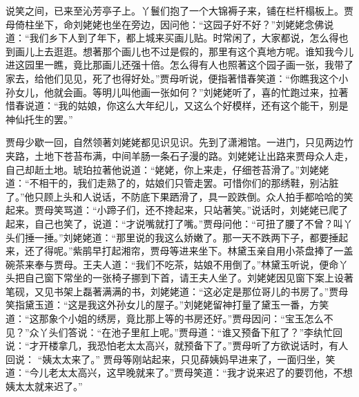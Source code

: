 \begin{parag}
    说笑之间，已来至沁芳亭子上。丫鬟们抱了一个大锦褥子来，铺在栏杆榻板上。贾母倚柱坐下，命刘姥姥也坐在旁边，因问他：“这园子好不好？”刘姥姥念佛说道：“我们乡下人到了年下，都上城来买画儿贴。时常闲了，大家都说，怎么得也到画儿上去逛逛。想著那个画儿也不过是假的，那里有这个真地方呢。谁知我今儿进这园里一瞧，竟比那画儿还强十倍。怎么得有人也照著这个园子画一张，我带了家去，给他们见见，死了也得好处。”贾母听说，便指著惜春笑道：“你瞧我这个小孙女儿，他就会画。等明儿叫他画一张如何？”刘姥姥听了，喜的忙跑过来，拉著惜春说道：“我的姑娘，你这么大年纪儿，又这么个好模样，还有这个能干，别是神仙托生的罢。”
\end{parag}


\begin{parag}
    贾母少歇一回，自然领著刘姥姥都见识见识。先到了潇湘馆。一进门，只见两边竹夹路，土地下苍苔布满，中间羊肠一条石子漫的路。刘姥姥让出路来贾母众人走，自己却赾土地。琥珀拉著他说道：“姥姥，你上来走，仔细苍苔滑了。”刘姥姥道：“不相干的，我们走熟了的，姑娘们只管走罢。可惜你们的那绣鞋，别沾脏了。”他只顾上头和人说话，不防底下果跴滑了，具一跤跌倒。众人拍手都哈哈的笑起来。贾母笑骂道：“小蹄子们，还不搀起来，只站著笑。”说话时，刘姥姥已爬了起来，自己也笑了，说道：“才说嘴就打了嘴。”贾母问他：“可扭了腰了不曾？叫丫头们捶一捶。”刘姥姥道：“那里说的我这么娇嫩了。那一天不跌两下子，都要捶起来，还了得呢。”紫鹃早打起湘帘，贾母等进来坐下。林黛玉亲自用小茶盘捧了一盖碗茶来奉与贾母。王夫人道：“我们不吃茶，姑娘不用倒了。”林黛玉听说，便命丫头把自己窗下常坐的一张椅子挪到下首，请王夫人坐了。刘姥姥因见窗下案上设著笔砚，又见书架上磊著满满的书，刘姥姥道：“这必定是那位哥儿的书房了。”贾母笑指黛玉道：“这是我这外孙女儿的屋子。”刘姥姥留神打量了黛玉一番，方笑道：“这那象个小姐的绣房，竟比那上等的书房还好。”贾母因问：“宝玉怎么不见？”众丫头们答说：“在池子里舡上呢。”贾母道：“谁又预备下舡了？”李纨忙回说：“才开楼拿几，我恐怕老太太高兴，就预备下了。”贾母听了方欲说话时，有人回说： “姨太太来了。” 贾母等刚站起来，只见薛姨妈早进来了，一面归坐，笑道：“今儿老太太高兴，这早晚就来了。”贾母笑道：“我才说来迟了的要罚他，不想姨太太就来迟了。”
\end{parag}


